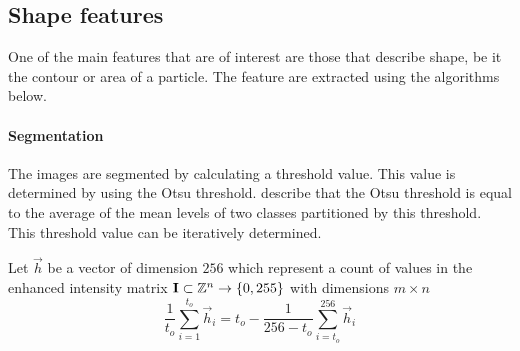 \documentclass[11pt,fleqn,,a4paper,twoside,openright]{book}
\begin{document}
\subsection{Shape features}
One of the main features that are of interest are those that describe shape, be it the contour or area of a particle. The feature are extracted using the algorithms below.

\paragraph{Segmentation}
The images are segmented by calculating a threshold value. This value is determined by using the Otsu threshold. \citeauthor{Xu2011956} \cite{Xu2011956} describe that the Otsu threshold is equal to the average of the mean levels of two classes partitioned by this threshold. This threshold value can be iteratively determined.

\begin{sBox}
	Let $\vec{h}$ be a vector of dimension $256$ which represent a count of values in the enhanced intensity matrix $\mat{I} \subset \mathbb{Z}^n \rightarrow \{0, 255\}$ with dimensions $m \times n$
	\begin{equation}\label{OtsuMethodEq}
	\frac{1}{t_o}\sum\limits_{i=1}^{t_o} \vec{h}_i = t_o - \frac{1}{256 - t_o}\sum\limits_{i=t_o}^{256} \vec{h}_i
	\end{equation}
\end{sBox}
\end{document}
